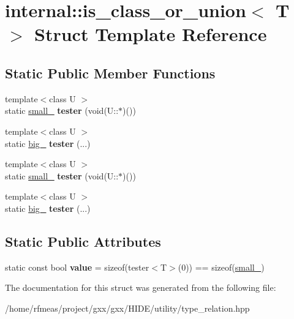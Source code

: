 \hypertarget{structinternal_1_1is__class__or__union}{}\section{internal\+:\+:is\+\_\+class\+\_\+or\+\_\+union$<$ T $>$ Struct Template Reference}
\label{structinternal_1_1is__class__or__union}
\subsection*{Static Public Member Functions}
\begin{DoxyCompactItemize}
\item 
{\footnotesize template$<$class U $>$ }\\static \hyperlink{structsmall__}{small\+\_\+} {\bfseries tester} (void(U\+::$\ast$)())\hypertarget{structinternal_1_1is__class__or__union_a22e4417833361354206206372ab34d16}{}\label{structinternal_1_1is__class__or__union_a22e4417833361354206206372ab34d16}

\item 
{\footnotesize template$<$class U $>$ }\\static \hyperlink{structbig__}{big\+\_\+} {\bfseries tester} (...)\hypertarget{structinternal_1_1is__class__or__union_a0fd4dae655d93b62631d9f9bc28f01c1}{}\label{structinternal_1_1is__class__or__union_a0fd4dae655d93b62631d9f9bc28f01c1}

\item 
{\footnotesize template$<$class U $>$ }\\static \hyperlink{structsmall__}{small\+\_\+} {\bfseries tester} (void(U\+::$\ast$)())\hypertarget{structinternal_1_1is__class__or__union_a22e4417833361354206206372ab34d16}{}\label{structinternal_1_1is__class__or__union_a22e4417833361354206206372ab34d16}

\item 
{\footnotesize template$<$class U $>$ }\\static \hyperlink{structbig__}{big\+\_\+} {\bfseries tester} (...)\hypertarget{structinternal_1_1is__class__or__union_a0fd4dae655d93b62631d9f9bc28f01c1}{}\label{structinternal_1_1is__class__or__union_a0fd4dae655d93b62631d9f9bc28f01c1}

\end{DoxyCompactItemize}
\subsection*{Static Public Attributes}
\begin{DoxyCompactItemize}
\item 
static const bool {\bfseries value} = sizeof(tester$<$T$>$(0)) == sizeof(\hyperlink{structsmall__}{small\+\_\+})\hypertarget{structinternal_1_1is__class__or__union_a64b06df7556834575cd5fcfcc4f46770}{}\label{structinternal_1_1is__class__or__union_a64b06df7556834575cd5fcfcc4f46770}

\end{DoxyCompactItemize}


The documentation for this struct was generated from the following file\+:\begin{DoxyCompactItemize}
\item 
/home/rfmeas/project/gxx/gxx/\+H\+I\+D\+E/utility/type\+\_\+relation.\+hpp\end{DoxyCompactItemize}
